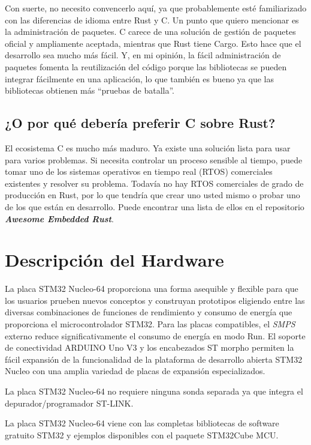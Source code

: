 Con suerte, no necesito convencerlo aquí, ya que probablemente esté familiarizado con las diferencias de idioma entre Rust y C. Un punto que quiero mencionar es la administración de paquetes. C carece de una solución de gestión de paquetes oficial y ampliamente aceptada, mientras que Rust tiene Cargo. Esto hace que el desarrollo sea mucho más fácil. Y, en mi opinión, la fácil administración de paquetes fomenta la reutilización del código porque las bibliotecas se pueden integrar fácilmente en una aplicación, lo que también es bueno ya que las bibliotecas obtienen más ``pruebas de batalla''.

\subsection{¿O por qué debería preferir C sobre Rust?}


El ecosistema C es mucho más maduro. Ya existe una solución lista para usar para varios problemas. Si necesita controlar un proceso sensible al tiempo, puede tomar uno de los sistemas operativos en tiempo real (RTOS) comerciales existentes y resolver su problema. Todavía no hay RTOS comerciales de grado de producción en Rust, por lo que tendría que crear uno usted mismo o probar uno de los que están en desarrollo. Puede encontrar una lista de ellos en el repositorio \textit{\textbf{Awesome Embedded Rust}}.



\section{Descripción del Hardware}

La placa STM32 Nucleo-64 proporciona una forma asequible y flexible para que los usuarios prueben nuevos conceptos y construyan prototipos eligiendo entre las diversas combinaciones de funciones de rendimiento y consumo de energía que proporciona el microcontrolador STM32. Para las placas compatibles, el \textit{SMPS} externo reduce significativamente el consumo de energía en modo Run. El soporte de conectividad ARDUINO Uno V3 y los encabezados ST morpho permiten la fácil expansión de la funcionalidad de la plataforma de desarrollo abierta STM32 Nucleo con una amplia variedad de placas de expansión especializados.

La placa STM32 Nucleo-64 no requiere ninguna sonda separada ya que integra el depurador/programador ST-LINK.

La placa STM32 Nucleo-64 viene con las completas bibliotecas de software gratuito STM32 y ejemplos disponibles con el paquete STM32Cube MCU.

